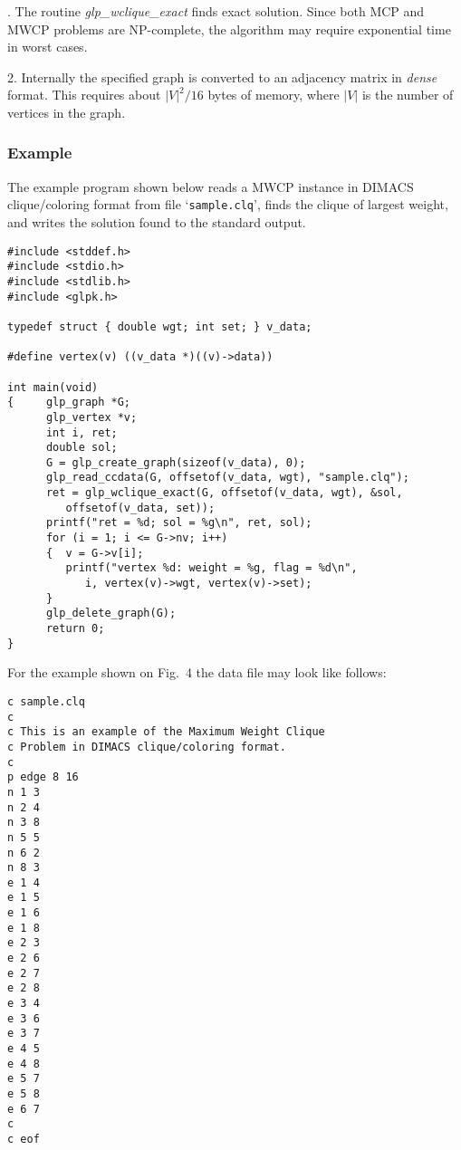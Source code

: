 \documentclass[dvipdfm,11pt]{report}
\begin{document}
\noindent{}. The routine {\it glp\_wclique\_exact} finds exact solution. Since
both MCP and MWCP problems are NP-complete, the algorithm may require
exponential time in worst cases.

2. Internally the specified graph is converted to an adjacency matrix
in {\it dense} format. This requires about $|V|^2/16$ bytes of memory,
where $|V|$ is the number of vertices in the graph.

\subsubsection*{Example}

The example program shown below reads a MWCP instance in DIMACS
clique/coloring format from file `\verb|sample.clq|', finds the clique
of largest weight, and writes the solution found to the standard output.

\begin{footnotesize}
\begin{verbatim}
#include <stddef.h>
#include <stdio.h>
#include <stdlib.h>
#include <glpk.h>

typedef struct { double wgt; int set; } v_data;

#define vertex(v) ((v_data *)((v)->data))

int main(void)
{     glp_graph *G;
      glp_vertex *v;
      int i, ret;
      double sol;
      G = glp_create_graph(sizeof(v_data), 0);
      glp_read_ccdata(G, offsetof(v_data, wgt), "sample.clq");
      ret = glp_wclique_exact(G, offsetof(v_data, wgt), &sol,
         offsetof(v_data, set));
      printf("ret = %d; sol = %g\n", ret, sol);
      for (i = 1; i <= G->nv; i++)
      {  v = G->v[i];
         printf("vertex %d: weight = %g, flag = %d\n",
            i, vertex(v)->wgt, vertex(v)->set);
      }
      glp_delete_graph(G);
      return 0;
}
\end{verbatim}
\end{footnotesize}

\noindent
For the example shown on Fig.~4 the data file may look like follows:

\begin{footnotesize}
\begin{verbatim}
c sample.clq
c
c This is an example of the Maximum Weight Clique
c Problem in DIMACS clique/coloring format.
c
p edge 8 16
n 1 3
n 2 4
n 3 8
n 5 5
n 6 2
n 8 3
e 1 4
e 1 5
e 1 6
e 1 8
e 2 3
e 2 6
e 2 7
e 2 8
e 3 4
e 3 6
e 3 7
e 4 5
e 4 8
e 5 7
e 5 8
e 6 7
c
c eof
\end{verbatim}
\end{footnotesize}
\end{document}
